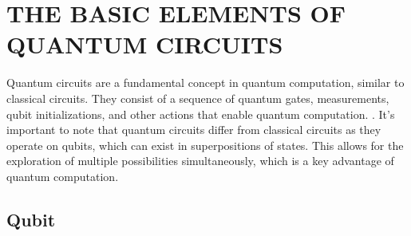 \documentclass[inscr,ack,preface]{diphdthesis}
\begin{document}
\chapter{THE BASIC ELEMENTS OF QUANTUM CIRCUITS}

Quantum circuits are a fundamental concept in quantum computation, similar to classical circuits. They consist of a sequence of quantum gates, measurements, \acrshort{qubit} initializations, and other actions that enable quantum computation. \cite{niel}. It's important to note that quantum circuits differ from classical circuits as they operate on \acrshort{qubit}s, which can exist in superpositions of states. This allows for the exploration of multiple possibilities simultaneously, which is a key advantage of quantum computation. 

\section{Qubit}
\end{document}
